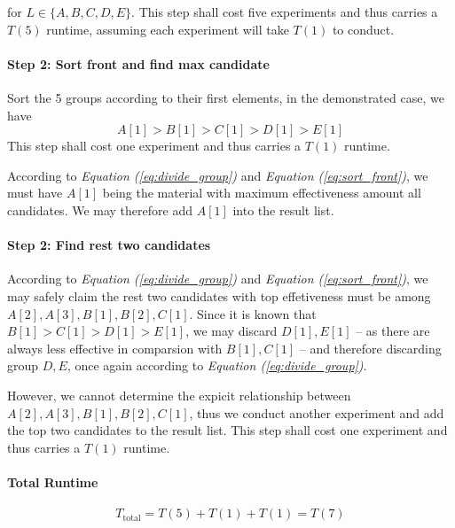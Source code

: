 \documentclass[11pt]{article}
\begin{document}
for $L \in \{A, B, C, D, E\}$. This step shall cost five experiments and thus carries a $T(5)$ runtime, assuming each experiment will take $T(1)$ to conduct.

\paragraph{Step 2: Sort front and find max candidate\newline}
Sort the 5 groups according to their first elements, in the demonstrated case, we have
\begin{equation}
    A[1] > B[1] > C[1] > D[1] > E[1] \label{eq:sort_front}
\end{equation}
This step shall cost one experiment and thus carries a $T(1)$ runtime.


According to \textit{Equation (\ref{eq:divide_group})} and \textit{Equation (\ref{eq:sort_front})}, we must have $A[1]$ being the material with maximum effectiveness amount all candidates. We may therefore add $A[1]$ into the result list.


\paragraph{Step 2: Find rest two candidates\newline}

According to \textit{Equation (\ref{eq:divide_group})} and \textit{Equation (\ref{eq:sort_front})}, we may safely claim the rest two candidates with top effetiveness must be among $A[2], A[3], B[1], B[2], C[1]$. Since it is known that $B[1] > C[1] > D[1] > E[1]$, we may discard $D[1], E[1]$ -- as there are always less effective in comparsion with $B[1], C[1]$ -- and therefore discarding group $D, E$, once again according to \textit{Equation (\ref{eq:divide_group})}.

However, we cannot determine the expicit relationship between  $A[2], A[3], B[1], B[2], C[1]$, thus we conduct another experiment and add the top two candidates to the result list. This step shall cost one experiment and thus carries a $T(1)$ runtime.


\paragraph{Total Runtime}

\begin{equation}
    T_{\text{total}} = T(5) + T(1) + T(1) = T(7) \label{eq:q4_runtime}
\end{equation}
\end{document}
